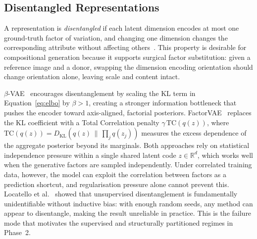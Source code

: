 \subsection{Disentangled Representations}

A representation is \emph{disentangled} if each latent dimension encodes at most one
ground-truth factor of variation, and changing one dimension changes the corresponding
attribute without affecting others~\citep{disentengaled_representation_learning,
on_disentangled_representation_learning}. This property is desirable for compositional
generation because it supports surgical factor substitution: given a reference image and a
donor, swapping the dimension encoding orientation should change orientation alone, leaving
scale and content intact.

$\beta$-VAE~\citep{Higgins2016betaVAELB} encourages disentanglement by scaling the KL term
in Equation~\ref{eq:elbo} by $\beta > 1$, creating a stronger information bottleneck that
pushes the encoder toward axis-aligned, factorial posteriors. FactorVAE~\citep{disentangling_by_factorising}
replaces the KL coefficient with a Total Correlation penalty $\gamma\,\mathrm{TC}(q(z))$,
where $\mathrm{TC}(q(z)) = D_{\mathrm{KL}}(q(z)\,\|\,\prod_j q(z_j))$ measures the excess
dependence of the aggregate posterior beyond its marginals. Both approaches rely on
statistical independence pressure within a single shared latent code $z \in \mathbb{R}^d$,
which works well when the generative factors are sampled independently. Under correlated
training data, however, the model can exploit the correlation between factors as a
prediction shortcut, and regularisation pressure alone cannot prevent this. Locatello et
al.~\citep{locatello2019challenging} showed that unsupervised disentanglement is
fundamentally unidentifiable without inductive bias: with enough random seeds, any method
can appear to disentangle, making the result unreliable in practice. This is the failure
mode that motivates the supervised and structurally partitioned regimes in Phase~2.

